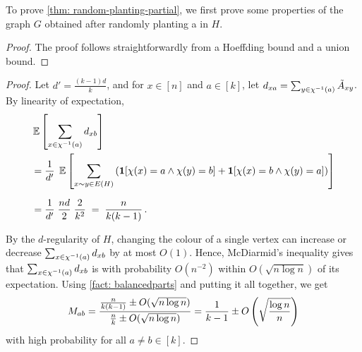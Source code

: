 To prove \cref{thm: random-planting-partial}, we first prove some properties of the graph $G$ obtained after randomly planting a \kcl in $H$.

\begin{proof}
    The proof follows straightforwardly from a Hoeffding bound and a union bound.
\end{proof}


\begin{proof}
    Let $d' = \frac{(k-1)d}{k}$, and for $x \in [n]$ and $a \in [k]$, let $d_{xa} = \sum_{y \in \chi^{-1}(a)} \tilde{A}_{xy}$.
    By linearity of expectation,
    \[
    \begin{aligned}
    &\operatorname*{\mathbb{E}}\left[\sum_{x\in \chi^{-1}(a)} d_{xb}\right]\\
    &= \frac1{d'}\;\operatorname*{\mathbb{E}}\left[\sum_{x\sim y\in E(H)}
        \left(\mathbf{1}[\chi(x)=a\land\chi(y)=b]
            +\mathbf{1}[\chi(x)=b\land\chi(y)=a]\right)\right] \\[6pt]
    &= \frac1{d'}\;\frac{nd}{2}\;\frac{2}{k^2}
    \;=\;\frac{n}{k(k-1)}\,.
    \end{aligned}
    \]

    By the $d$-regularity of $H$, changing the colour of a single vertex can increase or decrease $\sum_{x\in \chi^{-1}(a)} d_{xb}$ by at most $O(1)$. Hence, McDiarmid's inequality gives that $\sum_{x\in \chi^{-1}(a)} d_{xb}$ is with probability $O(n^{-2})$ within $O(\sqrt{n\log{n}})$ of its expectation. Using \cref{fact: balancedparts} and putting it all together, we get
    $$M_{ab}=\frac{\frac{n}{k(k-1)}\pm O(\sqrt{n\log{n}})}{\frac{n}{k}\pm O(\sqrt{n\log{n}})}=\frac1{k-1}\pm O\left(\sqrt{\frac{\log n}{n}}\right)$$
    with high probability for all $a \neq b \in [k]$.
\end{proof}

